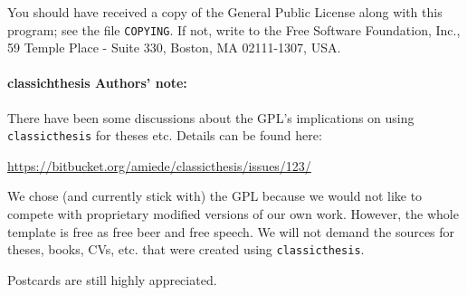 You should have received a copy of the  General
Public License
along with this program; see the file \texttt{COPYING}.  If not,
write to
the Free Software Foundation, Inc., 59 Temple Place - Suite 330,
Boston, MA 02111-1307, USA.

\paragraph{classichthesis Authors' note:} There have been some discussions about the GPL's implications on using \texttt{classicthesis} for theses etc. Details can be found here:
\begin{center}
  \url{https://bitbucket.org/amiede/classicthesis/issues/123/}
\end{center}

We chose (and currently stick with) the GPL because we would not like to compete with proprietary modified versions of our own work. However, the whole template is free as free beer and free speech. We will not demand the sources for theses, books, CVs, etc. that were created using \texttt{classicthesis}.

Postcards are still highly appreciated.





